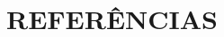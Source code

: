 \documentclass[../main.tex]{subfiles}
\begin{document}
\chapter*[Referências]{REFERÊNCIAS}
\nocite{*}


\end{document}
